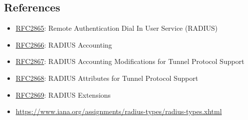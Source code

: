 \documentclass[documentation]{subfiles}
\begin{document}




\subsection{References}
\begin{itemize}
    \item \href{https://tools.ietf.org/html/rfc2865}{RFC2865}: Remote Authentication Dial In User Service (RADIUS)
    \item \href{https://tools.ietf.org/html/rfc2866}{RFC2866}: RADIUS Accounting
    \item \href{https://tools.ietf.org/html/rfc2867}{RFC2867}: RADIUS Accounting Modifications for Tunnel Protocol Support
    \item \href{https://tools.ietf.org/html/rfc2868}{RFC2868}: RADIUS Attributes for Tunnel Protocol Support
    \item \href{https://tools.ietf.org/html/rfc2869}{RFC2869}: RADIUS Extensions
    \item \url{https://www.iana.org/assignments/radius-types/radius-types.xhtml}
\end{itemize}
\end{document}
